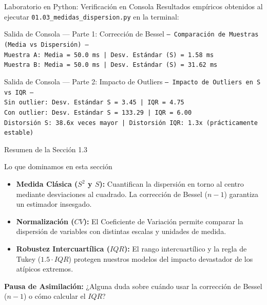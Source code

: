 \documentclass[10pt,aspectratio=169]{beamer}
\begin{document}
\begin{frame}{Laboratorio en Python: Verificación en Consola}
  Resultados empíricos obtenidos al ejecutar \texttt{01.03\_medidas\_dispersion.py} en la terminal:
  \vspace{0.6em}

  \begin{block}{\footnotesize Salida de Consola — Parte 1: Corrección de Bessel}
    {\fontsize{6.5pt}{7.5pt}\selectfont
    \texttt{--- Comparación de Muestras (Media vs Dispersión) ---} \\
    \texttt{Muestra A: Media = 50.0 ms | Desv. Estándar (S) = 1.58 ms} \\
    \texttt{Muestra B: Media = 50.0 ms | Desv. Estándar (S) = 31.62 ms}
    }
  \end{block}

  \vspace{0.3em}
  \begin{alertblock}{\footnotesize Salida de Consola — Parte 2: Impacto de Outliers}
    {\fontsize{6.5pt}{7.5pt}\selectfont
    \texttt{--- Impacto de Outliers en S vs IQR ---} \\
    \texttt{Sin outlier:  Desv. Estándar S = 3.45   | IQR = 4.75} \\
    \texttt{Con outlier:  Desv. Estándar S = 133.29 | IQR = 6.00} \\
    \texttt{Distorsión S: 38.6x veces mayor | Distorsión IQR: 1.3x (prácticamente estable)}
    }
  \end{alertblock}
\end{frame}

\begin{frame}{Resumen de la Sección 1.3}
  \begin{block}{Lo que dominamos en esta sección}
    \begin{itemize}
      \item \textbf{Medida Clásica ($S^2$ y $S$):} Cuantifican la dispersión en torno al centro mediante desviaciones al cuadrado. La corrección de Bessel ($n-1$) garantiza un estimador insesgado. \pause
      \item \textbf{Normalización ($CV$):} El Coeficiente de Variación permite comparar la dispersión de variables con distintas escalas y unidades de medida. \pause
      \item \textbf{Robustez Intercuartílica ($IQR$):} El rango intercuartílico y la regla de Tukey ($1.5 \cdot IQR$) protegen nuestros modelos del impacto devastador de los atípicos extremos.
    \end{itemize}
  \end{block}
  \pause
  \vspace{0.6em}
  \begin{center}
    \color{TecAzulOscuro}\textbf{Pausa de Asimilación:} ¿Alguna duda sobre cuándo usar la corrección de Bessel ($n-1$) o cómo calcular el $IQR$?
    \color{black}
  \end{center}
\end{frame}
\end{document}
